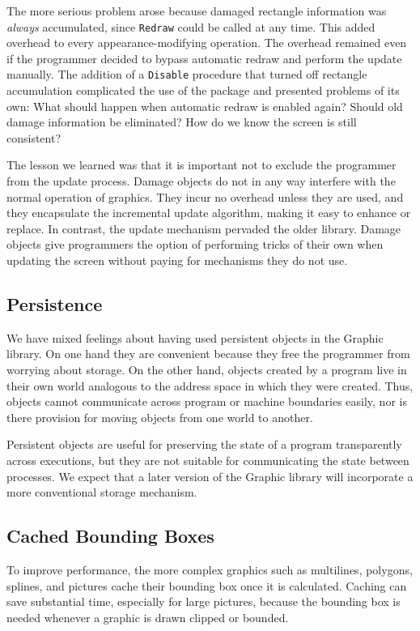 The more serious problem arose because damaged rectangle information
was {\em always} accumulated, since {\tt Redraw} could be called
at any time.  This added overhead to every appearance-modifying operation.
The overhead remained even if the programmer decided to bypass
automatic redraw and perform the update manually.  The addition of
a {\tt Disable} procedure that turned off rectangle accumulation complicated
the use of the package and presented problems of its own: What should happen
when automatic redraw is enabled again?  Should old damage information be
eliminated?  How do we know the screen is still consistent?

The lesson we learned was that it is important not to exclude the programmer
from the update process.  Damage objects do not in any way interfere with
the normal operation of graphics.  They incur no overhead unless they are
used, and they encapsulate the incremental update algorithm, making it easy
to enhance or replace.  In contrast, the update mechanism pervaded the older
library.  Damage objects give programmers the option of performing tricks
of their own when updating the screen without paying for mechanisms they do
not use.

\subsection{Persistence}

We have mixed feelings about having used persistent objects in the Graphic
library.  On one hand they are convenient because they free the programmer
from worrying about storage.  On the other hand, objects created by a
program live in their own world analogous to the address space in which they
were created.  Thus, objects cannot communicate across program or machine
boundaries easily, nor is there provision for moving objects from one world
to another.

Persistent objects are useful for preserving the state
of a program transparently
across executions, but they are not suitable for
communicating the state between processes.
We expect that a later version of the Graphic library will
incorporate a more conventional storage mechanism.

\subsection{Cached Bounding Boxes}

To improve performance, the more complex graphics such as multilines,
polygons, splines, and pictures cache their bounding box once it is
calculated.  Caching can save substantial time, especially for large
pictures, because the bounding box is needed whenever a graphic is drawn
clipped or bounded.  

